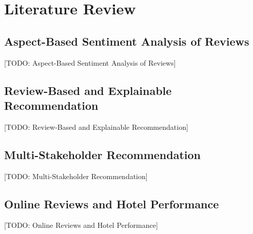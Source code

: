 \chapter{Literature Review}
\section{Aspect-Based Sentiment Analysis of Reviews}
[TODO: Aspect-Based Sentiment Analysis of Reviews]

\section{Review-Based and Explainable Recommendation}
[TODO: Review-Based and Explainable Recommendation]

\section{Multi-Stakeholder Recommendation}
[TODO: Multi-Stakeholder Recommendation]

\section{Online Reviews and Hotel Performance}
[TODO: Online Reviews and Hotel Performance]
